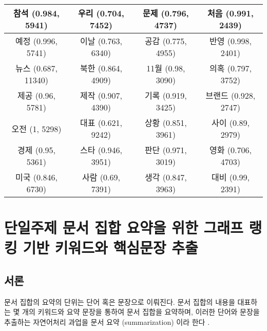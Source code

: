 \documentclass[oneside, ko,phd]{snuthesis_utf8_kor}
\begin{document}
\begin{table}[H]
{\begin{tabular}{|c|c|c|c|}
참석 (0.984, 5941) & 우리 (0.704, 7452) & 문제 (0.796, 4737) & 처음 (0.991, 2439) \\ \hline
예정 (0.996, 5741) & 이날 (0.763, 6340) & 공감 (0.775, 4955) & 반영 (0.998, 2401) \\ \hline
뉴스 (0.687, 11340) & 북한 (0.864, 4909) & 11월 (0.98, 3090) & 의혹 (0.797, 3752) \\ \hline
제공 (0.96, 5781) & 제작 (0.907, 4390) & 기록 (0.919, 3425) & 브랜드 (0.928, 2747) \\ \hline
오전 (1, 5298) & 대표 (0.621, 9242) & 상황 (0.851, 3961) & 사이 (0.89, 2979) \\ \hline
경제 (0.95, 5361) & 스타 (0.946, 3951) & 판단 (0.971, 3019) & 영화 (0.706, 4703) \\ \hline
미국 (0.846, 6730) & 사람 (0.69, 7391) & 생각 (0.847, 3963) & 대비 (0.99, 2391) \\ \hline
\end{tabular}%
}
\end{table}

\newpage
\chapter{단일주제 문서 집합 요약을 위한 그래프 랭킹 기반 키워드와 핵심문장 추출} \label{summarize_single_topic}

\section{서론}

문서 집합의 요약의 단위는 단어 혹은 문장으로 이뤄진다.
문서 집합의 내용을 대표하는 몇 개의 키워드와 요약 문장을 통하여 문서 집합을 요약하며, 이러한 단어와 문장을 추출하는 자연어처리 과업을 문서 요약 (summarization) 이라 한다 \cite{yao2017recent}.
\end{document}
